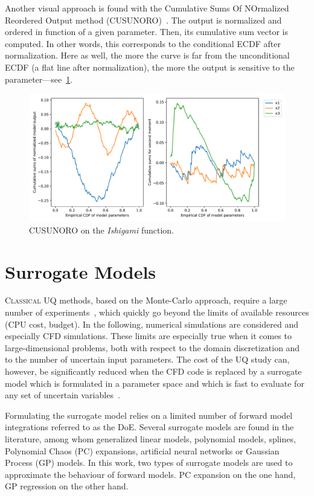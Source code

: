 Another visual approach is found with the Cumulative Sums Of NOrmalized Reordered Output method (CUSUNORO)~\cite{Plischke2012}. The output is normalized and ordered in function of a given parameter. Then, its cumulative sum vector is computed. In other words, this corresponds to the conditional ECDF after normalization. Here as well, the more the curve is far from the unconditional ECDF (a flat line after normalization), the more the output is sensitive to the parameter---see~\cref{fig:cusunoro}.

\begin{figure}[!h]
\centering
\includegraphics[width=0.8\linewidth,keepaspectratio]{fig/literature/cusunoro-ishigami.pdf}
\caption{CUSUNORO on the \emph{Ishigami} function.}
\label{fig:cusunoro}
\end{figure}


\section{Surrogate Models}\label{sec:surrogate}

\lettrine{C}{lassical} UQ methods, based on the Monte-Carlo approach, require a large number of experiments~\citep{iooss2010,iooss2016,lamboni2011,lemaitreknio2010,saltelli2007,storlie2009}, which quickly go beyond the limits of available resources (CPU cost, budget). In the following, numerical simulations are considered and especially CFD simulations. These limits are especially true when it comes to large-dimensional problems, both with respect to the domain discretization and to the number of uncertain input parameters. The cost of the UQ study can, however, be significantly reduced when the CFD code is replaced by a surrogate model which is formulated in a parameter space and which is fast to evaluate for any set of uncertain variables~\cite{martin2005}.

Formulating the surrogate model relies on a limited number of forward model integrations referred to as the DoE. Several surrogate models are found in the literature, among whom generalized linear models, polynomial models, splines, Polynomial Chaos (PC) expansions, artificial neural networks or Gaussian Process (GP) models. In this work, two types of surrogate models are used to approximate the behaviour of forward models. PC expansion on the one hand, GP regression on the other hand. 

